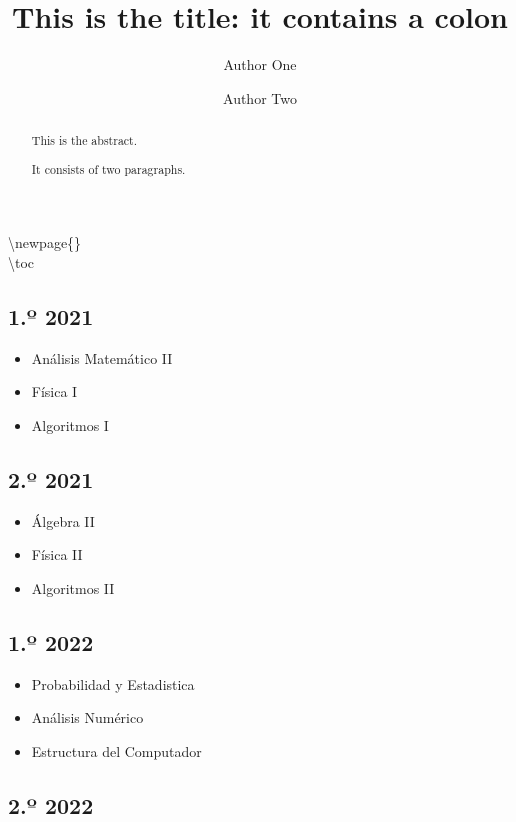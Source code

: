 \documentclass[
]{article}
\title{This is the title: it contains a colon}
\author{Author One \and Author Two}
\date{}
\providecommand{\tightlist}{%
  \setlength{\itemsep}{0pt}\setlength{\parskip}{0pt}}
\begin{document}
\maketitle
\begin{abstract}
This is the abstract.

It consists of two paragraphs.
\end{abstract}

\textbackslash newpage\{\}\\
\textbackslash toc

\hypertarget{uxba-2021}{%
\subsection{1.º 2021}\label{uxba-2021}}

\begin{itemize}
\tightlist
\item
  Análisis Matemático II
\item
  Física I
\item
  Algoritmos I
\end{itemize}

\hypertarget{uxba-2021-1}{%
\subsection{2.º 2021}\label{uxba-2021-1}}

\begin{itemize}
\tightlist
\item
  Álgebra II
\item
  Física II
\item
  Algoritmos II
\end{itemize}

\hypertarget{uxba-2022}{%
\subsection{1.º 2022}\label{uxba-2022}}

\begin{itemize}
\tightlist
\item
  Probabilidad y Estadistica
\item
  Análisis Numérico
\item
  Estructura del Computador
\end{itemize}

\hypertarget{uxba-2022-1}{%
\subsection{2.º 2022}\label{uxba-2022-1}}
\end{document}
